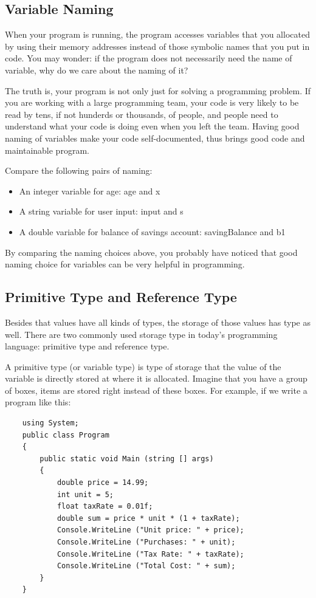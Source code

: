 \documentclass[../main.tex]{subfiles}
\begin{document}
\subsection{Variable Naming}
When your program is running, the program accesses variables that you allocated
by using their memory addresses instead of those symbolic names that you put in
code. You may wonder: if the program does not necessarily need the name of
variable, why do we care about the naming of it?

The truth is, your program is not only just for solving a programming problem.
If you are working with a large programming team, your code is very likely to
be read by tens, if not hunderds or thousands, of people, and people need to
understand what your code is doing even when you left the team. Having good
naming of variables make your code self-documented, thus brings good code and
maintainable program.

Compare the following pairs of naming:
\begin{itemize}
    \item An integer variable for age: age and x
    \item A string variable for user input: input and s
    \item A double variable for balance of savings account: savingBalance and b1
\end{itemize}
By comparing the naming choices above, you probably have noticed that good
naming choice for variables can be very helpful in programming.

\subsection{Primitive Type and Reference Type}
Besides that values have all kinds of types, the storage of those values has
type as well. There are two commonly used storage type in today's programming
language: primitive type and reference type.

A primitive type (or variable type) is type of storage that the value of the
variable is directly stored at where it is allocated. Imagine that you have a
group of boxes, items are stored right instead of these boxes. For example, if
we write a program like this:

\begin{verbatim}
    using System;
    public class Program
    {
        public static void Main (string [] args)
        {
            double price = 14.99;
            int unit = 5;
            float taxRate = 0.01f;
            double sum = price * unit * (1 + taxRate);
            Console.WriteLine ("Unit price: " + price);
            Console.WriteLine ("Purchases: " + unit);
            Console.WriteLine ("Tax Rate: " + taxRate);
            Console.WriteLine ("Total Cost: " + sum);
        }
    }
\end{verbatim}
\end{document}
